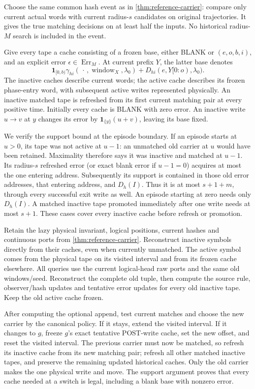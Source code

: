 \begin{informalproof}
Choose the same common hash event as in \cref{thm:reference-carrier}:
compare only current actual words with current radius-$s$ candidates on
original trajectories. It gives the true matching decisions on at least
half the inputs. No historical radius-$M$ search is included in the event.

Give every tape a cache consisting of a frozen base, either BLANK or
$(e,o,b,i)$, and an explicit error $\epsilon\in\operatorname{Err}_M$.
At current prefix $Y$, the latter base denotes
\[
 \mathbf1_{[0,b)}\gamma_{hi}(\,\cdot\,,\operatorname{window}_X,
                 \lambda_0)+D_{hi}(e,Y[0:o),\lambda_0).
\]
The inactive caches describe current words; the active cache describes its
frozen phase-entry word, with subsequent active writes represented physically.
An inactive matched tape is refreshed from its first current matching pair
at every positive time. Initially every cache is BLANK with zero error.
An inactive write $u\to v$ at $y$ changes its error by
$\mathbf1_{\{y\}}(u+v)$, leaving its base fixed.

We verify the support bound at the episode boundary. If an episode starts
at $u>0$, its tape was not active at $u-1$: an unmatched old carrier at
$u$ would have been retained. Maximality therefore says it was inactive
and matched at $u-1$. Its radius-$s$ refreshed error (or exact blank error
if $u-1=0$) acquires at most the one entering address. Subsequently its
support is contained in those old error addresses, that entering address,
and $D_h(I)$. Thus it is at most $s+1+m$, through every successful exit
write as well. An episode starting at zero needs only $D_h(I)$. A matched
inactive tape promoted immediately after one write needs at most $s+1$.
These cases cover every inactive cache before refresh or promotion.

Retain the lazy physical invariant, logical positions, current hashes and
continuous ports from \cref{thm:reference-carrier}. Reconstruct inactive
symbols directly from their caches, even when currently unmatched. The
active symbol comes from the physical tape on its visited interval and
from its frozen cache elsewhere. All queries use the current logical-head
raw ports and the same old windows/seed. Reconstruct the complete old tuple,
then compute the source rule, observer/hash updates and tentative error
updates for every old inactive tape. Keep the old active cache frozen.

After computing the optional append, test current matches and choose the
new carrier by the canonical policy. If it stays, extend the visited
interval. If it changes to $g$, freeze $g$'s exact tentative POST-write
cache, set the new offset, and reset the visited interval. The previous
carrier must now be matched, so refresh its inactive cache from its new
matching pair; refresh all other matched inactive tapes, and preserve the
remaining updated historical caches. Only the old carrier makes the one
physical write and move. The support argument proves that every cache
needed at a switch is legal, including a blank base with nonzero error.


\end{informalproof}
